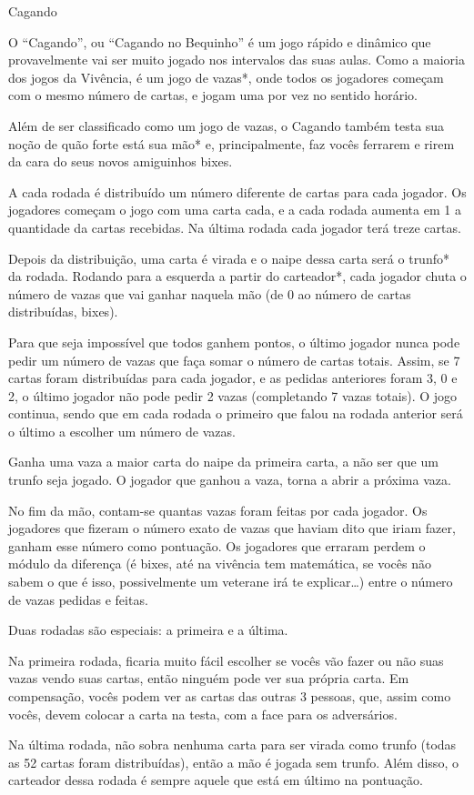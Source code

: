 \begin{subsecao}{Cagando}

O ``Cagando'', ou ``Cagando no Bequinho'' é um jogo rápido e dinâmico que
provavelmente vai ser muito jogado nos intervalos das suas aulas. Como a maioria
dos jogos da Vivência, é um jogo de vazas*, onde todos os jogadores começam com
o mesmo número de cartas, e jogam uma por vez no sentido horário.

Além de ser classificado como um jogo de vazas, o Cagando também testa sua noção
de quão forte está sua mão* e, principalmente, faz vocês ferrarem e rirem da
cara do seus novos amiguinhos bixes.

A cada rodada é distribuído um número diferente de cartas para cada jogador. Os
jogadores começam o jogo com uma carta cada, e a cada rodada aumenta em 1 a
quantidade da cartas recebidas. Na última rodada cada jogador terá treze cartas.

Depois da distribuição, uma carta é virada e o naipe dessa carta será o trunfo*
da rodada. Rodando para a esquerda a partir do carteador*, cada jogador chuta o
número de vazas que vai ganhar naquela mão (de 0 ao número de cartas
distribuídas, bixes).

Para que seja impossível que todos ganhem pontos, o último jogador nunca pode
pedir um número de vazas que faça somar o número de cartas totais. Assim, se 7
cartas foram distribuídas para cada jogador, e as pedidas anteriores foram 3, 0
e 2, o último jogador não pode pedir 2 vazas (completando 7 vazas totais). O
jogo continua, sendo que em cada rodada o primeiro que falou na rodada anterior
será o último a escolher um número de vazas. 

Ganha uma vaza a maior carta do naipe da primeira carta, a não ser que um
trunfo seja jogado. O jogador que ganhou a vaza, torna a abrir a próxima vaza. 

No fim da mão, contam-se quantas vazas foram feitas por cada
jogador. Os jogadores que fizeram o número exato de vazas que haviam
dito que iriam fazer, ganham esse número como pontuação. Os jogadores
que erraram perdem o módulo da diferença (é bixes, até na vivência tem
matemática, se vocês não sabem o que é isso, possivelmente um veterane
irá te explicar\dots) entre o número de vazas pedidas e feitas.

Duas rodadas são especiais: a primeira e a última. 

Na primeira rodada, ficaria muito fácil escolher se vocês vão fazer ou não suas
vazas vendo suas cartas, então ninguém pode ver sua própria carta. Em
compensação, vocês podem ver as cartas das outras 3 pessoas, que, assim como
vocês, devem colocar a carta na testa, com a face para os adversários.

Na última rodada, não sobra nenhuma carta para ser virada como trunfo (todas
as 52 cartas foram distribuídas), então a mão é jogada sem trunfo. Além disso,
o carteador dessa rodada é sempre aquele que está em último na pontuação.

\end{subsecao}
